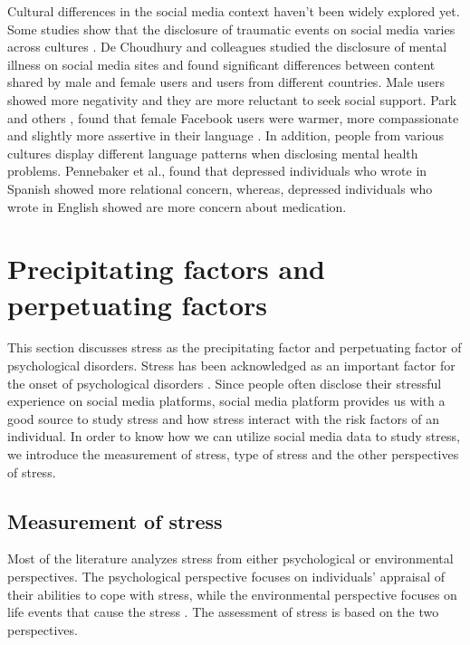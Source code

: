 Cultural differences in the social media context haven't been widely explored yet. Some studies show that the disclosure of traumatic events on social media varies across cultures \cite{freitag2011talking,de2016quantifying}. De Choudhury and colleagues \citet{de_choudhury_gender_2017}studied the disclosure of mental illness on social media sites and found significant differences between content shared by male and female users and users from different countries. Male users showed more negativity and they are more reluctant to seek social support.  Park and others \citet{ramirez2008psychology}, found that female Facebook users were warmer, more compassionate and slightly more assertive in their language \cite{park_women_2016}. In addition, people from various cultures display different language patterns when disclosing mental health problems. Pennebaker et al., found that depressed individuals who wrote in Spanish showed more relational concern, whereas, depressed individuals who wrote in English showed are more concern about medication.

\section{Precipitating factors and perpetuating factors}
This section discusses stress as the precipitating factor and perpetuating factor of psychological disorders. Stress has been acknowledged as an important factor for the onset of psychological disorders \cite{langner1963life}. Since people often disclose their stressful experience on social media platforms, social media platform provides us with a good source to study stress and how stress interact with the risk factors of an individual. In order to know how we can utilize social media data to study stress, we introduce the measurement of stress, type of stress and the other perspectives of stress.

\subsection{Measurement of stress}
Most of the literature analyzes stress from either psychological or environmental perspectives. The psychological perspective focuses on individuals' appraisal of their abilities to cope with stress, while the environmental perspective focuses on life events that cause the stress \cite{mcgrath1970social}. The assessment of stress is based on the two perspectives.

